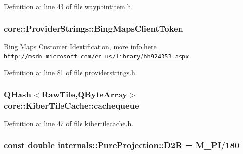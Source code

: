 \-Definition at line 43 of file waypointitem.\-h.

\hypertarget{group___o_p_map_widget_ga4c3a944c12deba7b13251f0c04685ac6}{
\subsubsection[{\-Bing\-Maps\-Client\-Token}]{ {\bf core\-::\-Provider\-Strings\-::\-Bing\-Maps\-Client\-Token}}}\label{group___o_p_map_widget_ga4c3a944c12deba7b13251f0c04685ac6}


\-Bing \-Maps \-Customer \-Identification, more info here \href{http://msdn.microsoft.com/en-us/library/bb924353.aspx}{\tt http\-://msdn.\-microsoft.\-com/en-\/us/library/bb924353.\-aspx}. 



\-Definition at line 81 of file providerstrings.\-h.

\hypertarget{group___o_p_map_widget_ga632c3be1045d7e97d09885aba0c18100}{
\subsubsection[{cachequeue}]{\setlength{\rightskip}{0pt plus 5cm}\-Q\-Hash$<$\-Raw\-Tile,\-Q\-Byte\-Array$>$ {\bf core\-::\-Kiber\-Tile\-Cache\-::cachequeue}}}\label{group___o_p_map_widget_ga632c3be1045d7e97d09885aba0c18100}


\-Definition at line 47 of file kibertilecache.\-h.

\hypertarget{group___o_p_map_widget_ga52ec5ac7446a549728bf6e9c798ed6f6}{
\subsubsection[{\-D2\-R}]{\setlength{\rightskip}{0pt plus 5cm}const double {\bf internals\-::\-Pure\-Projection\-::\-D2\-R} = \-M\-\_\-\-P\-I/180}}\label{group___o_p_map_widget_ga52ec5ac7446a549728bf6e9c798ed6f6}


